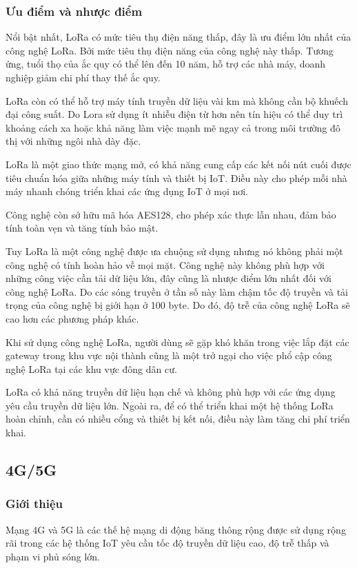 \subsubsection{Ưu điểm và nhược điểm}
Nổi bật nhất, LoRa có mức tiêu thụ điện năng thấp, đây là ưu điểm lớn nhất của công nghệ LoRa. Bởi mức tiêu thụ điện năng của công nghệ này thấp. Tương ứng, tuổi thọ của ắc quy có thể lên đến 10 năm, hỗ trợ các nhà máy, doanh nghiệp giảm chi phí thay thế ắc quy.

LoRa còn có thể hỗ trợ máy tính truyền dữ liệu vài km mà không cần bộ khuếch đại công suất. Do Lora sử dụng ít nhiễu điện từ hơn nên tín hiệu có thể duy trì khoảng cách xa hoặc khả năng làm việc mạnh mẽ ngay cả trong môi trường đô thị với những ngôi nhà dày đặc. 

LoRa là một giao thức mạng mở, có khả năng cung cấp các kết nối nút cuối được tiêu chuẩn hóa giữa những máy tính và thiết bị IoT. Điều này cho phép mỗi nhà máy nhanh chóng triển khai các ứng dụng IoT ở mọi nơi. 

Công nghệ còn sở hữu mã hóa AES128, cho phép xác thực lẫn nhau, đảm bảo tính toàn vẹn và tăng tính bảo mật.

Tuy LoRa là một công nghệ được ưa chuộng sử dụng nhưng nó không phải một công nghệ có tính hoàn hảo về mọi mặt. Công nghệ này không phù hợp với những công việc cần tải dữ liệu lớn, đây cũng là nhược điểm lớn nhất đối với công nghệ LoRa. Do các sóng truyền ở tần số này làm chậm tốc độ truyền và tải trọng của công nghệ bị giới hạn ở 100 byte. Do đó, độ trễ của công nghệ LoRa sẽ cao hơn các phương pháp khác.

Khi sử dụng công nghệ LoRa, người dùng sẽ gặp khó khăn trong việc lắp đặt các gateway trong khu vực nội thành cũng là một trở ngại cho việc phổ cập công nghệ LoRa tại các khu vực đông dân cư.

LoRa có khả năng truyền dữ liệu hạn chế và không phù hợp với các ứng dụng yêu cầu truyền dữ liệu lớn. Ngoài ra, để có thể triển khai một hệ thống LoRa hoàn chỉnh, cần có nhiều cổng và thiết bị kết nối, điều này làm tăng chi phí triển khai.

\subsection{4G/5G}
\subsubsection{Giới thiệu}
Mạng 4G và 5G là các thế hệ mạng di động băng thông rộng được sử dụng rộng rãi trong các hệ thống IoT yêu cầu tốc độ truyền dữ liệu cao, độ trễ thấp và phạm vi phủ sóng lớn. 

